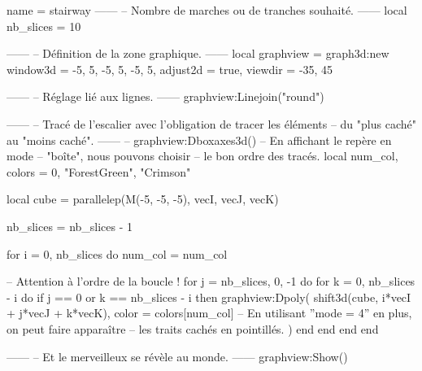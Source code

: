 \documentclass{standalone}
\begin{document}
\begin{luadraw}{name = stairway}
------
-- Nombre de marches ou de tranches souhaité.
------
local nb_slices = 10

------
-- Définition de la zone graphique.
------
local graphview = graph3d:new{
  window3d = {-5, 5, -5, 5, -5, 5},
  adjust2d = true,
  viewdir  = {-35, 45}
}

------
-- Réglage lié aux lignes.
------
graphview:Linejoin("round")

------
-- Tracé de l'escalier avec l'obligation de tracer les éléments
-- du "plus caché" au "moins caché".
------
-- graphview:Dboxaxes3d()  -- En affichant le repère en mode
                        -- "boîte", nous pouvons choisir
                        -- le bon ordre des tracés.
local num_col, colors = 0, {"ForestGreen", "Crimson"}

local cube = parallelep(M(-5, -5, -5), vecI, vecJ, vecK)

nb_slices = nb_slices - 1

for i = 0, nb_slices do
  num_col = num_col%

-- Attention à l'ordre de la boucle !
  for j = nb_slices, 0, -1 do
    for k = 0, nb_slices - i do
      if j == 0 or k == nb_slices - i then
        graphview:Dpoly(
          shift3d(cube, i*vecI + j*vecJ + k*vecK),
          {
            color = colors[num_col]
-- En utilisant ''mode = 4'' en plus, on peut faire apparaître
-- les traits cachés en pointillés.
          })
      end
    end
  end
end

------
-- Et le merveilleux se révèle au monde.
------
graphview:Show()
\end{luadraw}
\end{document}
